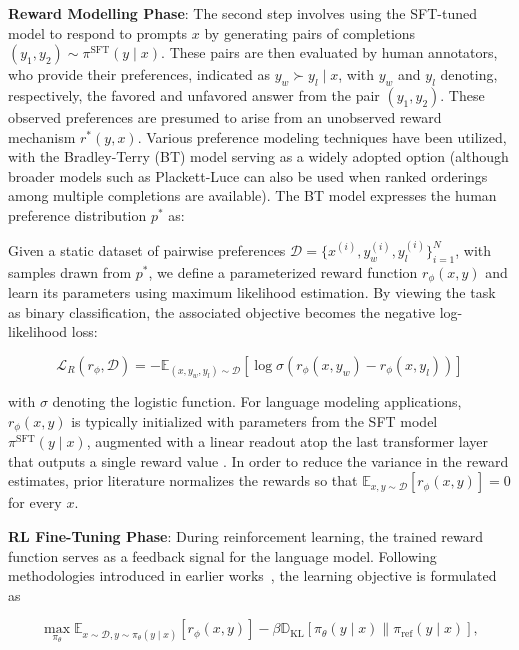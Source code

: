 \textbf{Reward Modelling Phase}: The second step involves using the SFT-tuned model to respond to prompts $x$ by generating pairs of completions $(y_1, y_2)\sim \pi^\text{SFT}(y \mid x)$. These pairs are then evaluated by human annotators, who provide their preferences, indicated as $y_w\succ y_l \mid x$, with $y_w$ and $y_l$ denoting, respectively, the favored and unfavored answer from the pair $(y_1, y_2)$. These observed preferences are presumed to arise from an unobserved reward mechanism $r^*(y, x)$. Various preference modeling techniques have been utilized, with the Bradley-Terry (BT) model \cite{bradley1952rankanalysis} serving as a widely adopted option (although broader models such as Plackett-Luce \citep{plackett1975analysis, luce2012individual} can also be used when ranked orderings among multiple completions are available). The BT model expresses the human preference distribution $p^*$ as:

Given a static dataset of pairwise preferences $\mathcal{D}=\bigl\{x^{(i)}, y_w^{(i)}, y_l^{(i)}\bigr\}_{i=1}^N$, with samples drawn from $p^*$, we define a parameterized reward function $r_{\phi}(x, y)$ and learn its parameters using maximum likelihood estimation. By viewing the task as binary classification, the associated objective becomes the negative log-likelihood loss:

\begin{equation}\label{eq:reward_model}
    \mathcal{L}_R(r_{\phi}, \mathcal{D}) = -\mathbb{E}_{(x, y_w, y_l)\sim \mathcal{D}}\left[\log \sigma(r_{\phi}(x, y_w) - r_{\phi}(x, y_l))\right]
\end{equation}

with $\sigma$ denoting the logistic function. For language modeling applications, $r_{\phi}(x, y)$ is typically initialized with parameters from the SFT model $\pi^\text{SFT}(y \mid x)$, augmented with a linear readout atop the last transformer layer that outputs a single reward value \cite{ziegler2020finetuning}. In order to reduce the variance in the reward estimates, prior literature normalizes the rewards so that $\mathbb{E}_{x,y\sim \mathcal{D}}\left[r_\phi(x, y)\right]=0$ for every $x$.

\textbf{RL Fine-Tuning Phase}: During reinforcement learning, the trained reward function serves as a feedback signal for the language model. Following methodologies introduced in earlier works~\citep{jaques2017sequence, jaques2020human}, the learning objective is formulated as

\begin{equation}\label{eq:RL}
\max_{\pi_{\theta}}  \mathbb{E}_{x\sim \mathcal{D}, y\sim \pi_{\theta}(y \mid x)}\left[r_{\phi}(x, y)\right] - \beta\mathbb{D}_{\textrm{KL}}\left[\pi_{\theta}(y\mid x) \| \pi_\text{ref}(y\mid x)\right],
\end{equation}

